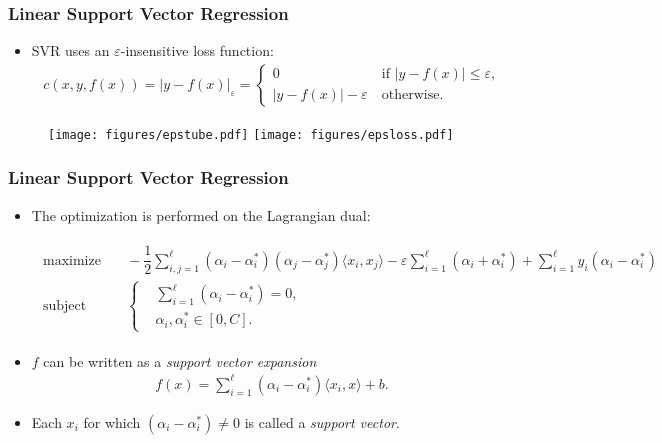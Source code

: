 \documentclass[table]{beamer}
\newcommand{\nologo}{\setbeamertemplate{logo}{}}
\begin{document}
{\nologo
\begin{frame}
\frametitle{Linear Support Vector Regression}
\begin{itemize}
\item SVR uses an $ \varepsilon $-insensitive loss function:
\begin{align*}
c(x,y,f(x)) = \vert y - f(x) \vert_{\varepsilon} = \begin{cases}
0 &\ \text{if } \vert y - f(x) \vert \leq \varepsilon \text{,}\\
\vert y - f(x) \vert - \varepsilon &\ \text{otherwise} \text{.}
\end{cases}
\end{align*}
\end{itemize}
\begin{figure}[h]
  	\centering
  	\texttt{[image: figures/epstube.pdf]}
  	\texttt{[image: figures/epsloss.pdf]}
\end{figure}
\end{frame}}

\begin{frame}
\frametitle{Linear Support Vector Regression}
\begin{itemize}
\item The optimization is performed on the Lagrangian dual:
\begin{scriptsize}
\begin{align*}
\begin{aligned}
\text{maximize} &\quad
-\dfrac{1}{2}\sum_{i,j=1}^{\ell}(\alpha_{i} - \alpha_{i}^{*})(\alpha_{j} - \alpha_{j}^{*})\langle x_{i},x_{j} \rangle -\varepsilon\sum_{i=1}^{\ell}(\alpha_{i} + \alpha_{i}^{*}) + \sum_{i=1}^{\ell}y_{i}(\alpha_{i}-\alpha_{i}^{*}) \\
\text{subject to} &\quad \left\{\begin{aligned}
&\sum_{i=1}^{\ell}(\alpha_{i} - \alpha_{i}^{*}) = 0 \text{,}\\
&\alpha_{i},\alpha_{i}^{*} \in [0,C] \text{.}
\end{aligned}\right.
\end{aligned}
\end{align*}
\end{scriptsize}
\item $ f $ can be written as a \textit{support vector expansion}
\begin{align*}
f(x) = \sum_{i=1}^{\ell}(\alpha_{i}-\alpha_{i}^{*})\langle x_{i},x\rangle + b \text{.}
\end{align*}
\item Each $ x_{i} $ for which $ (\alpha_{i}-\alpha_{i}^{*}) \neq 0 $ is called a \textit{support vector}.
\end{itemize}
\end{frame}
\end{document}
